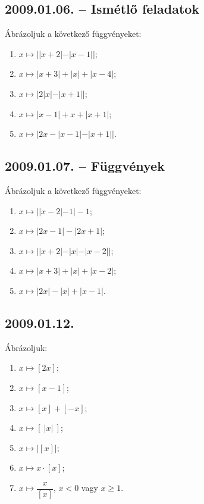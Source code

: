 \documentclass{article}
\begin{document}
\subsection*{2009.01.06. -- Ismétlő feladatok}
Ábrázoljuk a következő függvényeket:
\begin{enumerate}
\item $x\mapsto ||x+2|-|x-1||$;
\item $x\mapsto |x+3|+|x|+|x-4|$;
\item $x\mapsto |2|x|-|x+1||$;
\item $x\mapsto |x-1|+x+|x+1|$;
\item $x\mapsto |2x-|x-1|-|x+1||$.
\end{enumerate}


\subsection*{2009.01.07. -- Függvények}
Ábrázoljuk a következő függvényeket:
\begin{enumerate}
\item $x\mapsto ||x-2|-1|-1$;
\item $x\mapsto |2x-1|-|2x+1|$;
\item $x\mapsto ||x+2|-|x|-|x-2||$;
\item $x\mapsto |x+3|+|x|+|x-2|$;
\item $x\mapsto |2x|-|x|+|x-1|$.
\end{enumerate}


\subsection*{2009.01.12.}
Ábrázoljuk:
\begin{enumerate}
\item $x\mapsto [2x]$;
\item $x\mapsto [x-1]$;
\item $x\mapsto [x]+[-x]$;
\item $x\mapsto [~|x|~]$;
\item $x\mapsto \big|[x]\big|$;
\item $x\mapsto x\cdot [x]$;
\item $x\mapsto \dfrac{x}{[x]}$, $x<0$ vagy $x\ge 1$.
\end{enumerate}
\end{document}
